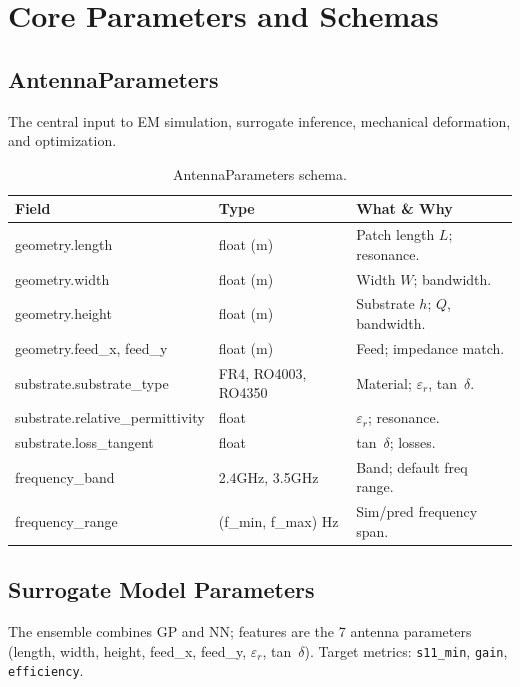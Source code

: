 \documentclass[11pt,a4paper]{article}
\begin{document}
\section{Core Parameters and Schemas}

\subsection{AntennaParameters}
The central input to EM simulation, surrogate inference, mechanical deformation, and optimization.

\begin{table}[htbp]
\centering
\small
\begin{tabularx}{\textwidth}{@{}lXl@{}}
\toprule
\textbf{Field} & \textbf{Type} & \textbf{What \& Why} \\
\midrule
geometry.length & float (m) & Patch length $L$; resonance. \\
geometry.width & float (m) & Width $W$; bandwidth. \\
geometry.height & float (m) & Substrate $h$; $Q$, bandwidth. \\
geometry.feed\_x, feed\_y & float (m) & Feed; impedance match. \\
substrate.substrate\_type & FR4, RO4003, RO4350 & Material; $\varepsilon_r$, tan~$\delta$. \\
substrate.relative\_permittivity & float & $\varepsilon_r$; resonance. \\
substrate.loss\_tangent & float & tan~$\delta$; losses. \\
frequency\_band & 2.4GHz, 3.5GHz & Band; default freq range. \\
frequency\_range & (f\_min, f\_max) Hz & Sim/pred frequency span. \\
\bottomrule
\end{tabularx}
\caption{AntennaParameters schema.}
\end{table}

\subsection{Surrogate Model Parameters}
The ensemble combines GP and NN; features are the 7 antenna parameters (length, width, height, feed\_x, feed\_y, $\varepsilon_r$, tan~$\delta$). Target metrics: \texttt{s11\_min}, \texttt{gain}, \texttt{efficiency}.
\end{document}
